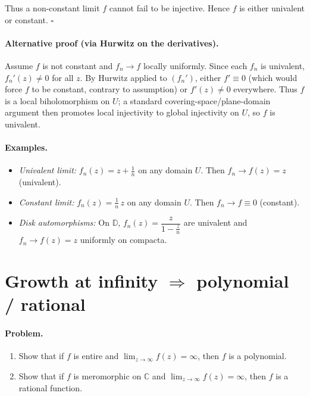 \documentclass[12pt,a4paper]{article}
\begin{document}
Thus a non-constant limit $f$ cannot fail to be injective.
Hence $f$ is either univalent or constant.
\hfill$\square$

\bigskip

\paragraph{Alternative proof (via Hurwitz on the derivatives).}
Assume $f$ is not constant and $f_n\to f$ locally uniformly.
Since each $f_n$ is univalent, $f_n'(z)\neq 0$ for all $z$.
By Hurwitz applied to $(f_n')$, either $f'\equiv 0$ (which would force $f$ to be constant,
contrary to assumption) or $f'(z)\neq 0$ everywhere.
Thus $f$ is a local biholomorphism on $U$; a standard covering-space/plane-domain argument
then promotes local injectivity to global injectivity on $U$, so $f$ is univalent.

\bigskip

\paragraph{Examples.}
\begin{itemize}
	\item \emph{Univalent limit:} $f_n(z)=z+\tfrac1n$ on any domain $U$.
	Then $f_n\to f(z)=z$ (univalent).
	\item \emph{Constant limit:} $f_n(z)=\tfrac1n\,z$ on any domain $U$.
	Then $f_n\to f\equiv 0$ (constant).
	\item \emph{Disk automorphisms:} On $\mathbb D$, $f_n(z)=\dfrac{z}{1-\frac{z}{n}}$ are univalent
	and $f_n\to f(z)=z$ uniformly on compacta.
\end{itemize}

\section*{Growth at infinity $\Rightarrow$ polynomial / rational}

\paragraph{Problem.}
\begin{enumerate}
	\item[(i)] Show that if $f$ is entire and $\displaystyle \lim_{z\to\infty} f(z)=\infty$, then $f$ is a polynomial.
	\item[(ii)] Show that if $f$ is meromorphic on $\mathbb C$ and $\displaystyle \lim_{z\to\infty} f(z)=\infty$, then $f$ is a rational function.
\end{enumerate}
\end{document}
